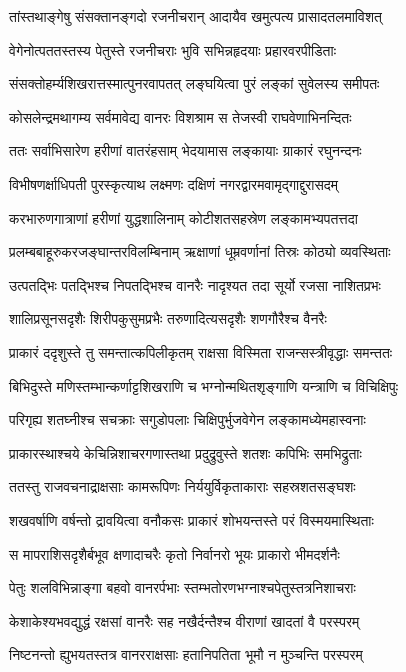 \twolineshloka
{तांस्तथाङ्गेषु संसक्तानङ्गदो रजनीचरान्}
{आदायैव खमुत्पत्य प्रासादतलमाविशत्}


\twolineshloka
{वेगेनोत्पततस्तस्य पेतुस्ते रजनीचराः}
{भुवि सभिन्नहृदयाः प्रहारवरपीडिताः}


\twolineshloka
{संसक्तोहर्म्यशिखरात्तस्मात्पुनरवापतत्}
{लङ्घयित्वा पुरं लङ्कां सुवेलस्य समीपतः}


\twolineshloka
{कोसलेन्द्रमथागम्य सर्वमावेद्य वानरः}
{विशश्राम स तेजस्वी राघवेणाभिनन्दितः}


\twolineshloka
{ततः सर्वाभिसारेण हरीणां वातरंहसाम्}
{भेदयामास लङ्कायाः ग्राकारं रघुनन्दनः}


\twolineshloka
{विभीषणर्क्षाधिपती पुरस्कृत्याथ लक्ष्मणः}
{दक्षिणं नगरद्वारमवामृद्गाद्दुरासदम्}


\twolineshloka
{करभारुणगात्राणां हरीणां युद्धशालिनाम्}
{कोटीशतसहस्रेण लङ्कामभ्यपतत्तदा}


\twolineshloka
{प्रलम्बबाहूरुकरजङ्घान्तरविलम्बिनाम्}
{ऋक्षाणां धूम्रवर्णानां तिस्रः कोठ्यो व्यवस्थिताः}


\twolineshloka
{उत्पतद्भिः पतद्भिश्च निपतद्भिश्च वानरैः}
{नादृश्यत तदा सूर्यो रजसा नाशितप्रभः}


\twolineshloka
{शालिप्रसूनसदृशैः शिरीपकुसुमप्रभैः}
{तरुणादित्यसदृशैः शणगौरैश्च वैनरैः}


\twolineshloka
{प्राकारं ददृशुस्ते तु समन्तात्कपिलीकृतम्}
{राक्षसा विस्मिता राजन्सस्त्रीवृद्धाः समन्ततः}


\twolineshloka
{बिभिदुस्ते मणिस्तम्भान्कर्णाट्टशिखराणि च}
{भग्नोन्मथितशृङ्गाणि यन्त्राणि च विचिक्षिपुः}


\twolineshloka
{परिगृह्य शतघ्नीश्च सचक्राः सगुडोपलाः}
{चिक्षिपुर्भुजवेगेन लङ्कामध्येमहास्वनाः}


\twolineshloka
{प्राकारस्थाश्चये केचिन्निशाचरगणास्तथा}
{प्रदुद्रुवुस्ते शतशः कपिभिः समभिद्रुताः}


\twolineshloka
{ततस्तु राजवचनाद्राक्षसाः कामरूपिणः}
{निर्ययुर्विकृताकाराः सहस्रशतसङ्घशः}


\twolineshloka
{शखवर्षाणि वर्षन्तो द्रावयित्वा वनौकसः}
{प्राकारं शोभयन्तस्ते परं विस्मयमास्थिताः}


\twolineshloka
{स मापराशिसदृशैर्बभूव क्षणादाचरैः}
{कृतो निर्वानरो भूयः प्राकारो भीमदर्शनैः}


\twolineshloka
{पेतुः शलविभिन्नाङ्गा बहवो वानरर्पभाः}
{स्तम्भतोरणभग्नाश्चपेतुस्तत्रनिशाचराः}


\twolineshloka
{केशाकेश्यभवद्युद्धं रक्षसां वानरैः सह}
{नखैर्दन्तैश्च वीराणां खादतां वै परस्परम्}


\twolineshloka
{निष्टनन्तो ह्युभयतस्तत्र वानरराक्षसाः}
{हतानिपतिता भूमौ न मुञ्चन्ति परस्परम्}


